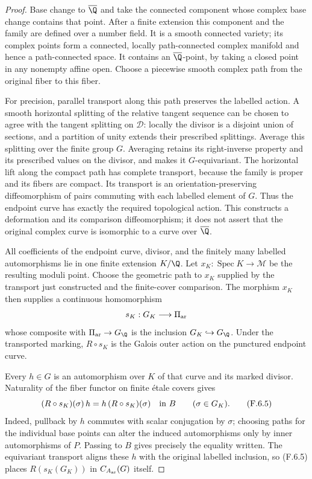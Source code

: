 \begin{proof}
Base change to $\overline\Q$ and take the connected component
whose complex base change contains that point.  After a
finite extension this component and the family are defined
over a number field.  It is a smooth connected variety; its
complex points form a connected, locally path-connected
complex manifold and hence a path-connected space.  It
contains an $\overline\Q$-point, by taking a closed point
in any nonempty affine open.  Choose a piecewise smooth
complex path from the original fiber to this fiber.

For precision, parallel transport along this path preserves
the labelled action.  A smooth horizontal splitting of the
relative tangent sequence can be chosen to agree with the
tangent splitting on $\mathcal D$: locally the divisor is
a disjoint union of sections, and a partition of unity
extends their prescribed splittings.  Average this splitting
over the finite group $G$.  Averaging retains its right-inverse
property and its prescribed values on the divisor, and
makes it $G$-equivariant.  The horizontal lift along the
compact path has complete transport, because the family
is proper and its fibers are compact.  Its transport is an
orientation-preserving diffeomorphism of pairs commuting
with each labelled element of $G$.  Thus the endpoint curve
has exactly the required topological action.  This constructs
a deformation and its comparison diffeomorphism; it does not
assert that the original complex curve is isomorphic to a
curve over $\overline\Q$.

All coefficients of the endpoint curve, divisor, and the
finitely many labelled automorphisms lie in one finite
extension $K/\Q$.  Let $x_K:\operatorname{Spec}K\to\mathscr M$
be the resulting moduli point.  Choose the geometric path
to $x_K$ supplied by the transport just constructed and the
finite-cover comparison.  The morphism $x_K$ then supplies
a continuous homomorphism
\[
 s_K:G_K\longrightarrow\Pi_{\rm ar}
\]
whose composite with $\Pi_{\rm ar}\to G_{\Q}$ is the
inclusion $G_K\hookrightarrow G_{\Q}$.  Under the transported
marking, $R\circ s_K$ is the Galois outer action on the
punctured endpoint curve.

Every $h\in G$ is an automorphism over $K$ of that curve and
its marked divisor.  Naturality of the fiber functor on finite
\'etale covers gives
\[
 (R\circ s_K)(\sigma)\,h
       =h\,(R\circ s_K)(\sigma)
 \quad\hbox{in }B\qquad(\sigma\in G_K).                \tag{F.6.5}
\]
Indeed, pullback by $h$ commutes with scalar conjugation by
$\sigma$; choosing paths for the individual base points can
alter the induced automorphisms only by inner automorphisms
of $P$.  Passing to $B$ gives precisely the equality written.
The equivariant transport aligns these $h$ with the original
labelled inclusion, so (F.6.5) places $R(s_K(G_K))$ in
$C_{A_{\rm ar}}(G)$ itself.


\end{proof}
